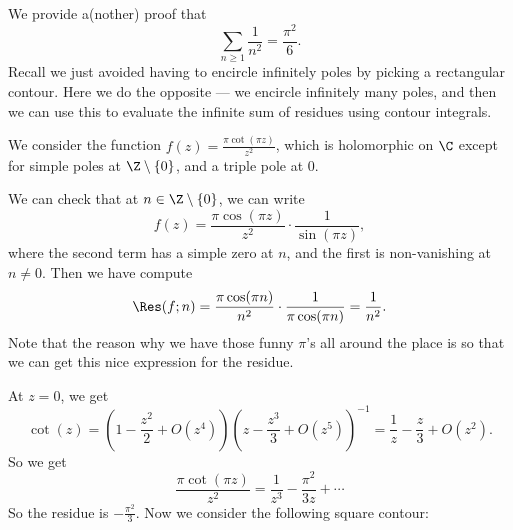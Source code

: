 \documentclass[a4paper]{article}
\begin{document}
\begin{eg}
  We provide a(nother) proof that
  \[
    \sum_{n \geq 1} \frac{1}{n^2} = \frac{\pi^2}{6}.
  \]
  Recall we just avoided having to encircle infinitely poles by picking a rectangular contour. Here we do the opposite --- we encircle infinitely many poles, and then we can use this to evaluate the infinite sum of residues using contour integrals.

  We consider the function $f(z) = \frac{\pi \cot(\pi z)}{z^2}$, which is holomorphic on $\C$ except for simple poles at $\Z \setminus \{0\}$, and a triple pole at $0$.

  We can check that at $n \in \Z \setminus \{0\}$, we can write
  \[
    f(z) = \frac{\pi \cos (\pi z)}{z^2} \cdot \frac{1}{\sin (\pi z)},
  \]
  where the second term has a simple zero at $n$, and the first is non-vanishing at $n \not= 0$. Then we have compute
  \[
    \Res(f; n) = \frac{\pi \cos (\pi n)}{n^2} \cdot \frac{1}{\pi \cos (\pi n)} = \frac{1}{n^2}.
  \]
  Note that the reason why we have those funny $\pi$'s all around the place is so that we can get this nice expression for the residue.

  At $z = 0$, we get
  \[
    \cot(z) = \left(1 - \frac{z^2}{2} + O(z^4)\right) \left(z - \frac{z^3}{3} + O(z^5)\right)^{-1} = \frac{1}{z} - \frac{z}{3} + O(z^2).
  \]
  So we get
  \[
    \frac{\pi \cot (\pi z)}{z^2} = \frac{1}{z^3} - \frac{\pi^2}{3z} + \cdots
  \]
  So the residue is $-\frac{\pi^2}{3}$. Now we consider the following square contour:
  \begin{center}
\end{center}
\end{eg}
\end{document}
